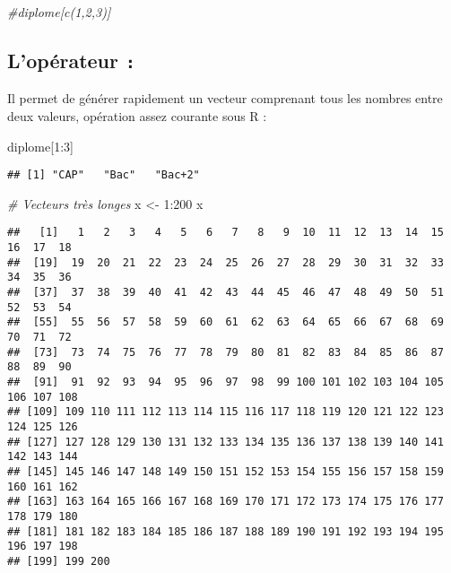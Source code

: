 \documentclass[
]{article}
\newenvironment{Shaded}{\begin{snugshade}}{\end{snugshade}}
\newcommand{\CommentTok}[1]{\textcolor[rgb]{0.56,0.35,0.01}{\textit{#1}}}
\newcommand{\DecValTok}[1]{\textcolor[rgb]{0.00,0.00,0.81}{#1}}
\newcommand{\NormalTok}[1]{#1}
\newcommand{\OtherTok}[1]{\textcolor[rgb]{0.56,0.35,0.01}{#1}}
\newcommand{\SpecialCharTok}[1]{\textcolor[rgb]{0.00,0.00,0.00}{#1}}
\begin{document}
\begin{Shaded}
\begin{Highlighting}[]
\CommentTok{\#diplome[c(1,2,3)]}
\end{Highlighting}
\end{Shaded}

\hypertarget{lopuxe9rateur}{%
\subsection{\texorpdfstring{L'opérateur
\texttt{:}}{L'opérateur :}}\label{lopuxe9rateur}}

Il permet de générer rapidement un vecteur comprenant tous les nombres
entre deux valeurs, opération assez courante sous R :

\begin{Shaded}
\begin{Highlighting}[]
\NormalTok{diplome[}\DecValTok{1}\SpecialCharTok{:}\DecValTok{3}\NormalTok{]}
\end{Highlighting}
\end{Shaded}

\begin{verbatim}
## [1] "CAP"   "Bac"   "Bac+2"
\end{verbatim}

\begin{Shaded}
\begin{Highlighting}[]
\CommentTok{\# Vecteurs très longes}
\NormalTok{x }\OtherTok{\textless{}{-}} \DecValTok{1}\SpecialCharTok{:}\DecValTok{200}
\NormalTok{x}
\end{Highlighting}
\end{Shaded}

\begin{verbatim}
##   [1]   1   2   3   4   5   6   7   8   9  10  11  12  13  14  15  16  17  18
##  [19]  19  20  21  22  23  24  25  26  27  28  29  30  31  32  33  34  35  36
##  [37]  37  38  39  40  41  42  43  44  45  46  47  48  49  50  51  52  53  54
##  [55]  55  56  57  58  59  60  61  62  63  64  65  66  67  68  69  70  71  72
##  [73]  73  74  75  76  77  78  79  80  81  82  83  84  85  86  87  88  89  90
##  [91]  91  92  93  94  95  96  97  98  99 100 101 102 103 104 105 106 107 108
## [109] 109 110 111 112 113 114 115 116 117 118 119 120 121 122 123 124 125 126
## [127] 127 128 129 130 131 132 133 134 135 136 137 138 139 140 141 142 143 144
## [145] 145 146 147 148 149 150 151 152 153 154 155 156 157 158 159 160 161 162
## [163] 163 164 165 166 167 168 169 170 171 172 173 174 175 176 177 178 179 180
## [181] 181 182 183 184 185 186 187 188 189 190 191 192 193 194 195 196 197 198
## [199] 199 200
\end{verbatim}
\end{document}
